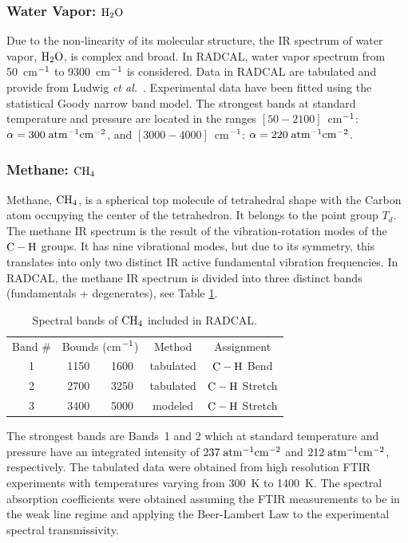 \subsubsection{Water Vapor: $\rm H_2O$}

Due to the non-linearity of its molecular structure, the IR spectrum of water vapor, $\rm H_2O$, is complex and broad. In RADCAL, water vapor spectrum from 50~cm$\rm ^{-1}$ to 9300~cm$\rm ^{-1}$ is considered. Data in RADCAL are tabulated and provide from Ludwig \textit{et al.}~\cite{Ludwig:NASA}. Experimental data have been fitted using the statistical Goody narrow band model. The strongest bands at standard temperature and pressure are located in the ranges $\left[50-2100\right]$~cm$\rm ^{-1}$: $\alpha = 300\;\rm {atm^{-1}cm^{-2}}$, and $\left[3000-4000\right]$~cm$\rm ^{-1}$: $\alpha = 220\;\rm {atm^{-1}cm^{-2}}$.

\subsubsection{Methane: $\rm CH_4$}

Methane, $\rm CH_4$, is a spherical top molecule of tetrahedral shape with the Carbon atom occupying the center of the tetrahedron. It belongs to the point group $T_d$. The methane IR spectrum is the result of the vibration-rotation modes of the $\rm C-H$ groups. It has nine vibrational modes, but due to its symmetry, this translates into only two distinct IR active fundamental vibration frequencies. In RADCAL, the methane IR spectrum is divided into three distinct bands (fundamentals + degenerates), see Table \ref{Table::CH4}.
\begin{table}[ht]
      \centering
      \caption{Spectral bands of $\rm CH_4$ included in RADCAL.}
      \vspace{0.1in}
      \label{Table::CH4}
    \begin{tabular}{|c|c|c|c|c|}
    \hline
    Band \# & \multicolumn{2}{|l|}{Bounds (cm$\rm ^{-1}$) } & Method & Assignment \\
    \cline{1-5}
    1 & 1150 & 1600 & tabulated &  $\rm C-H$ Bend\\
    2 & 2700 & 3250 & tabulated &  $\rm C-H$ Stretch\\
    3 & 3400 & 5000 & modeled   &  $\rm C-H$ Stretch \\
    \hline
   \end{tabular}
\end{table}
The strongest bands are Bands~1 and 2 which at standard temperature and pressure have an integrated intensity of $237\;\rm {atm^{-1}cm^{-2}}$ and $212\;\rm {atm^{-1}cm^{-2}}$, respectively. The tabulated data were obtained from high resolution FTIR experiments with temperatures varying from 300~K to 1400~K. The spectral absorption coefficients were obtained assuming the FTIR measurements to be in the weak line regime and applying the Beer-Lambert Law to the experimental spectral transmissivity.

